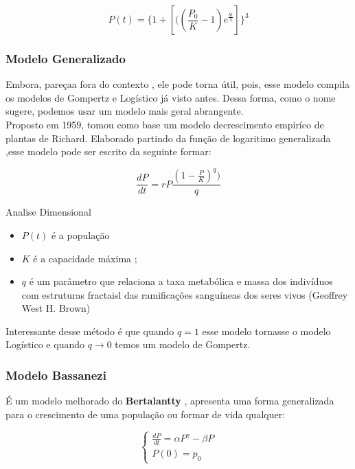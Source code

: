 \begin{equation*}
    P(t)=\{1+[((\frac{P_0}{K}
    -1)e^{\frac{bt}{3}}]\}^3
\end{equation*}


\subsubsection{ Modelo Generalizado }

Embora, pareçaa fora do contexto , ele pode torna útil, pois, esse modelo compila os modelos de Gompertz e Logístico já visto antes. Dessa forma, como o nome sugere, podemos usar um modelo mais geral abrangente.\\  
Proposto em 1959, tomou como base um modelo decrescimento empiríco de plantas de Richard. Elaborado partindo da função de logaritimo generalizada ,esse modelo pode ser escrito da seguinte formar:

\begin{equation*}
    \frac{dP}{dt} =rP
    \frac{(1-\frac{P}{K})^q)}{q}
\end{equation*}

Analise Dimensional
\begin{itemize}
    \item $P(t)$ é a população
    \item $K$ é a  capacidade máxima ;
    \item $q$ é um parâmetro que relaciona a taxa metabólica e massa dos indivíduos com estruturas fractaisl das ramificações sanguíneas dos seres vivos (Geoffrey West H. Brown)
\end{itemize}

Interessante desse método é que quando $q = 1$ esse modelo tornasse o modelo Logístico e quando $q \to 0$ temos um modelo de Gompertz.

\subsubsection{ Modelo Bassanezi }

É um modelo melhorado do \textbf{Bertalantty} , apresenta uma forma generalizada para o crescimento de uma população ou formar de vida qualquer: 

 \begin{equation*}
\begin{cases}
  \frac{dP}{dt} =\alpha P^{\gamma}- 
   \beta P\\
   P(0)=p_0  
\end{cases}
\end{equation*}

